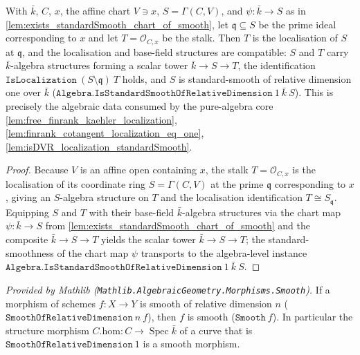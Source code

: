 \begin{lemma}

  \label{lem:stalk_standardSmooth_localization_of_smooth}
  With \(\bar k\), \(C\), \(x\), the affine chart \(V \ni x\),
  \(S = \Gamma(C, V)\), and \(\psi : \bar k \to S\) as in
  \cref{lem:exists_standardSmooth_chart_of_smooth}, let
  \(\mathfrak q \subseteq S\) be the prime ideal corresponding to \(x\) and let
  \(T = \mathcal O_{C, x}\) be the stalk. Then \(T\) is the localisation of
  \(S\) at \(\mathfrak q\), and the localisation and base-field structures are
  compatible: \(S\) and \(T\) carry \(\bar k\)-algebra structures forming a
  scalar tower \(\bar k \to S \to T\), the identification
  \(\texttt{IsLocalization}\ (S \setminus \mathfrak q)\ T\) holds, and \(S\) is
  standard-smooth of relative dimension one over \(\bar k\)
  (\(\texttt{Algebra.IsStandardSmoothOfRelativeDimension}\ 1\ \bar k\ S\)).
  This is precisely the algebraic data consumed by the pure-algebra core
  \cref{lem:free_finrank_kaehler_localization},
  \cref{lem:finrank_cotangent_localization_eq_one},
  \cref{lem:isDVR_localization_standardSmooth}.
\end{lemma}

\begin{proof}
  \leanok
  Because \(V\) is an affine open containing \(x\), the stalk
  \(T = \mathcal O_{C, x}\) is the localisation of its coordinate ring
  \(S = \Gamma(C, V)\) at the prime \(\mathfrak q\) corresponding to \(x\),
  giving an \(S\)-algebra structure on \(T\) and the localisation identification
  \(T \cong S_{\mathfrak q}\). Equipping \(S\) and \(T\) with their base-field
  \(\bar k\)-algebra structures via the chart map \(\psi : \bar k \to S\) from
  \cref{lem:exists_standardSmooth_chart_of_smooth} and the composite
  \(\bar k \to S \to T\) yields the scalar tower \(\bar k \to S \to T\); the
  standard-smoothness of the chart map \(\psi\) transports to the algebra-level
  instance \(\texttt{Algebra.IsStandardSmoothOfRelativeDimension}\ 1\ \bar k\ S\).
\end{proof}

\begin{lemma}
  \label{lem:smoothOfRelativeDimension_smooth}
  \mathlibok
  \textit{Provided by Mathlib
  (\texttt{Mathlib.AlgebraicGeometry.Morphisms.Smooth}).}
  If a morphism of schemes \(f : X \to Y\) is smooth of relative dimension
  \(n\) (\(\texttt{SmoothOfRelativeDimension}\ n\ f\)), then \(f\) is smooth
  (\(\texttt{Smooth}\ f\)). In particular the structure morphism
  \(C.\mathrm{hom} : C \to \operatorname{Spec} \bar k\) of a curve that is
  \(\texttt{SmoothOfRelativeDimension}\ 1\) is a smooth morphism.
\end{lemma}

